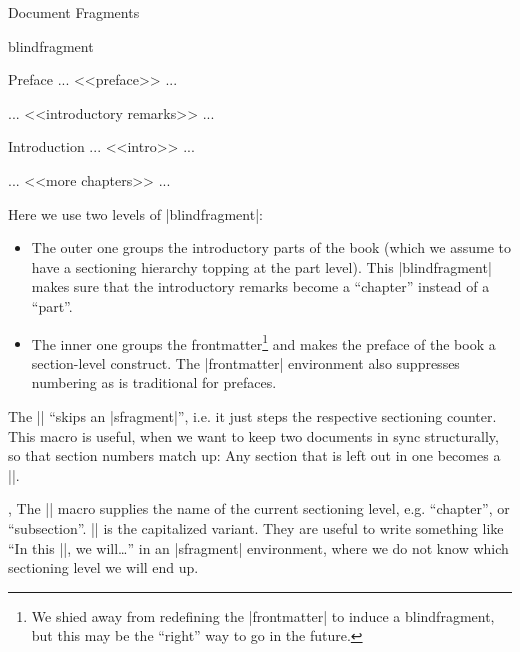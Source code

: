 \begin{sfragment}{Document Fragments}
\begin{environment}{blindfragment}
\begin{latexcode}
\begin{blindfragment}
\begin{blindfragment}
\begin{frontmatter}
\maketitle\newpage
\begin{sfragment}{Preface}
... <<preface>> ...
\end{sfragment}
\clearpage\setcounter{tocdepth}{4}\tableofcontents\clearpage
\end{frontmatter}
\end{blindfragment}
... <<introductory remarks>> ...
\end{blindfragment}
\begin{sfragment}{Introduction}
... <<intro>> ...
\end{sfragment}
... <<more chapters>> ... 


\end{latexcode}

Here we use two levels of |blindfragment|:
\begin{itemize}
\item The outer one groups the introductory parts of the book (which we assume to have a
  sectioning hierarchy topping at the part level). This |blindfragment| makes sure that
  the introductory remarks become a ``chapter'' instead of a ``part''.
\item The inner one groups the frontmatter\footnote{We shied away from redefining the
    |frontmatter| to induce a blindfragment, but this may be the ``right'' way to go in
    the future.} and makes the preface of the book a section-level construct. The
  |frontmatter| environment also suppresses numbering as is traditional for prefaces.
\end{itemize}
\end{environment}

\begin{function}{\skipfragment}
  The |\skipfragment| ``skips an |sfragment|'', i.e. it just steps the respective sectioning
  counter. This macro is useful, when we want to keep two documents in sync structurally,
  so that section numbers match up: Any section that is left out in one becomes a
  |\skipfragment|.
\end{function}

\begin{function}{\currentsectionlevel,\CurrentSectionLevel}
  The |\currentsectionlevel| macro supplies the name of the current sectioning level,
  e.g. ``chapter'', or ``subsection''. |\CurrentSectionLevel| is the capitalized
  variant. They are useful to write something like ``In this |\currentsectionlevel|, we
  will\ldots'' in an |sfragment| environment, where we do not know which sectioning level we
  will end up.
\end{function}
\end{sfragment}  

